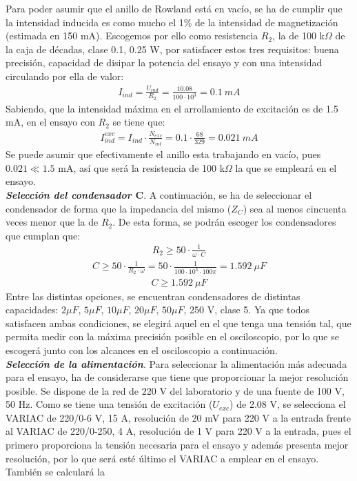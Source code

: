\documentclass[a4paper,titlepage]{article}
\begin{document}
Para poder asumir que el anillo de Rowland está en vacío, se ha de cumplir que la intensidad inducida es como mucho el 1\% de la intensidad de magnetización (estimada en 150 mA). Escogemos por ello como resistencia $R_2$, la de 100 k$\Omega$ de la caja de décadas, clase 0.1, 0.25 W, por satisfacer estos tres requisitos:  buena precisión, capacidad de disipar la potencia del ensayo y con una intensidad circulando por ella de valor:
\begin{gather*}
    I_{ind} = \frac{U_{ind}}{R_2}= \frac{10.08}{100\cdot10^3}=0.1\:mA
\end{gather*}
Sabiendo, que la intensidad máxima en el arrollamiento de excitación es de 1.5 mA, en el ensayo con $R_2$ se tiene que:
\begin{gather*}
    I_{ind}^{exc}= I_{ind}\cdot\frac{N_{exc}}{N_{int}}=0.1\cdot\frac{68}{329}= 0.021\:mA
\end{gather*}
Se puede asumir que efectivamente el anillo esta trabajando en vacío, pues $0.021\ll1.5$ mA, así que será la resistencia de 100 k$\Omega$ la que se empleará en el ensayo.\\

\textbf{\textit{Selección del condensador $\mathbf{C}$}}. A continuación, se ha de seleccionar el condensador de forma que la impedancia del mismo ($Z_C$) sea al menos cincuenta veces menor que la de $R_2$. De esta forma, se podrán escoger los condensadores que cumplan que:
\begin{gather*}
    R_2 \geq 50\cdot\frac{1}{\omega\cdot C}
\end{gather*}
\begin{gather*}
    C \geq 50\cdot\frac{1}{R_2\cdot \omega}=50\cdot\frac{1}{100\cdot10^3\cdot100\pi}=1.592\:\mu F
\end{gather*}
\begin{gather*}
    C\geq1.592\:\mu F
\end{gather*}
Entre las distintas opciones, se encuentran condensadores de distintas capacidades: $2\mu F$, $5\mu F$, $10\mu F$, $20\mu F$, $50\mu F$, 250 V, clase 5. Ya que todos satisfacen ambas condiciones, se elegirá aquel en el que tenga una tensión tal, que permita medir con la máxima precisión posible en el osciloscopio, por lo que se escogerá junto con los alcances en el osciloscopio a continuación.\\

\textbf{\textit{Selección de la alimentación}}. Para seleccionar la alimentación más adecuada para el ensayo, ha de considerarse que tiene que proporcionar la mejor resolución posible. Se dispone de la red de 220 V del laboratorio y de una fuente de 100 V, 50 Hz. Como se tiene una tensión de excitación ($U_{exc}$) de 2.08 V, se selecciona el VARIAC de 220/0-6 V, 15 A, resolución de 20 mV para 220 V a la entrada frente al VARIAC de 220/0-250, 4 A, resolución de 1 V para 220 V a la entrada, pues el primero proporciona la tensión necesaria para el ensayo y además presenta mejor resolución, por lo que será esté último el VARIAC a emplear en el ensayo. También se calculará la
\end{document}
